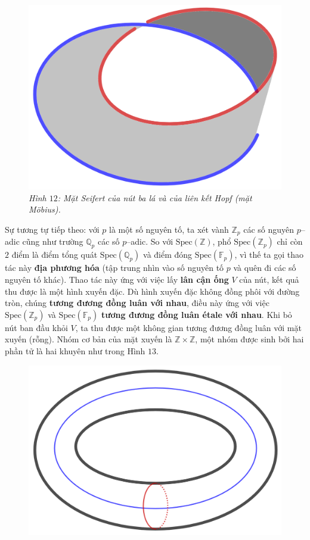 \begin{multicols}{2}
\begin{figure}[H]
		\includegraphics[width= 0.4\linewidth]{seifert2}
		\caption{\small\textit{\color{duongvaotoanhoc}Hình $12$: Mặt Seifert của nút ba lá và của liên kết Hopf (mặt M\"obius).}}
		\vspace*{-10pt}
	\end{figure}
	Sự tương tự tiếp theo: với $p$ là một số nguyên tố, ta xét vành $\mathbb{Z}_p$ các số nguyên $p$--adic cũng như trường $\mathbb{Q}_p$ các số $p$--adic. So với $\text{Spec}(\mathbb{Z})$, phổ $\text{Spec}(\mathbb{Z}_p)$ chỉ còn $2$ điểm là điểm tổng quát $\text{Spec}(\mathbb{Q}_p)$ và điểm đóng $\text{Spec}(\mathbb{F}_p)$, vì thế ta gọi thao tác này {\bf\color{duongvaotoanhoc} địa phương hóa} (tập trung nhìn vào số nguyên tố $p$ và quên đi các số nguyên tố khác). Thao tác này ứng với việc lấy {\bf\color{duongvaotoanhoc} lân cận ống} $V$ của nút, kết quả thu được là một hình xuyến đặc. Dù hình xuyến đặc không đồng phôi với đường tròn, chúng {\bf\color{duongvaotoanhoc} tương đương đồng luân với nhau}, điều này ứng với việc $\text{Spec}(\mathbb{Z}_p)$ và $\text{Spec}(\mathbb{F}_p)$ {\bf\color{duongvaotoanhoc} tương đương đồng luân étale với nhau}. Khi bỏ nút ban đầu khỏi $V$, ta thu được một không gian tương đương đồng luân với mặt xuyến (rỗng). Nhóm cơ bản của mặt xuyến là $\mathbb{Z} \times \mathbb{Z}$, một nhóm được sinh bởi hai phần tử là hai khuyên như trong Hình $13$.
	\begin{figure}[H]
		\vspace*{-5pt}
		\centering
		\captionsetup{labelformat= empty, justification=centering}
		\includegraphics[width= 0.7\linewidth]{h13}

\end{figure}
\end{multicols}
